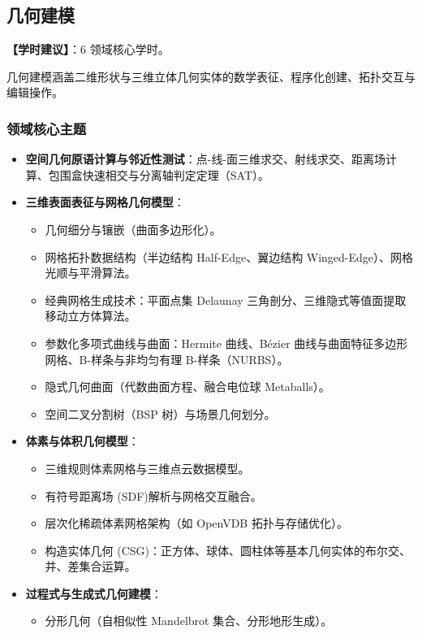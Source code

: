 \subsection{几何建模}
\textbf{【学时建议】}：6 领域核心学时。

几何建模涵盖二维形状与三维立体几何实体的数学表征、程序化创建、拓扑交互与编辑操作。

\subsubsection{领域核心主题}
\begin{itemize}
    \item \textbf{空间几何原语计算与邻近性测试}：点-线-面三维求交、射线求交、距离场计算、包围盒快速相交与分离轴判定定理（SAT）。
    \item \textbf{三维表面表征与网格几何模型}：
    \begin{itemize}
        \item 几何细分与镶嵌（曲面多边形化）。
        \item 网格拓扑数据结构（半边结构 Half-Edge、翼边结构 Winged-Edge）、网格光顺与平滑算法。
        \item 经典网格生成技术：平面点集 Delaunay 三角剖分、三维隐式等值面提取移动立方体算法。
        \item 参数化多项式曲线与曲面：Hermite 曲线、Bézier 曲线与曲面特征多边形网格、B-样条与非均匀有理 B-样条（NURBS）。
        \item 隐式几何曲面（代数曲面方程、融合电位球 Metaballs）。
        \item 空间二叉分割树（BSP 树）与场景几何划分。
    \end{itemize}
    \item \textbf{体素与体积几何模型}：
    \begin{itemize}
        \item 三维规则体素网格与三维点云数据模型。
        \item 有符号距离场 (SDF)解析与网格交互融合。
        \item 层次化稀疏体素网格架构（如 OpenVDB 拓扑与存储优化）。
        \item 构造实体几何 (CSG)：正方体、球体、圆柱体等基本几何实体的布尔交、并、差集合运算。
    \end{itemize}
    \item \textbf{过程式与生成式几何建模}：
    \begin{itemize}
        \item 分形几何（自相似性 Mandelbrot 集合、分形地形生成）。

\end{itemize}
\end{itemize}
